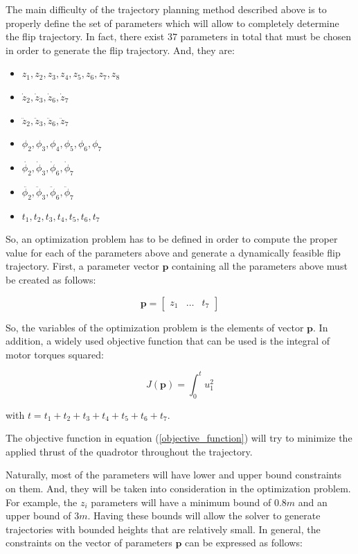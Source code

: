 \documentclass{thesisreport}
\begin{document}
The main difficulty of the trajectory planning method described above is to properly define the set of parameters which will allow to completely determine the flip trajectory. In fact, there exist $37$ parameters in total that must be chosen in order to generate the flip trajectory. And, they are:

\begin{itemize}
	\item $z_1,z_2,z_3,z_4,z_5,z_6,z_7,z_8$
	\item $\dot{z}_2, \dot{z}_3, \dot{z}_6, \dot{z}_7$
	\item $\ddot{z}_2, \ddot{z}_3, \ddot{z}_6, \ddot{z}_7$
	\item $\phi_2, \phi_3, \phi_4, \phi_5, \phi_6, \phi_7$
	\item $\dot{\phi_2}, \dot{\phi}_3, \dot{\phi}_6, \dot{\phi}_7$
	\item $\ddot{\phi_2}, \ddot{\phi}_3, \ddot{\phi}_6, \ddot{\phi}_7$
	\item $t_1, t_2, t_3, t_4, t_5, t_6, t_7$
\end{itemize}

So, an optimization problem has to be defined in order to compute the proper value for each of the parameters above and generate a dynamically feasible flip trajectory. First, a parameter vector $\bm{p}$ containing all the parameters above must be created as follows: 

\begin{equation}
	\bm{p} = \begin{bmatrix}
	z_1 & \ldots & t_7
		\end{bmatrix}
\end{equation}

So, the variables of the optimization problem is the elements of vector $\bm{p}$. In addition, a widely used objective function that can be used is the integral of motor torques squared: 

\begin{equation}\label{objective_function}
	J (\bm{p}) = \int_0^t u_1^2
\end{equation}

with $t = t_1 + t_2 + t_3 + t_4 + t_5 + t_6 + t_7$.

The objective function in equation (\ref{objective_function}) will try to minimize the applied thrust of the quadrotor throughout the trajectory.

Naturally, most of the parameters will have lower and upper bound constraints on them. And, they will be taken into consideration in the optimization problem. For example, the $z_i$ parameters will have a minimum bound of $0.8m$ and an upper bound of $3m$. Having these bounds will allow the solver to generate trajectories with bounded heights that are relatively small. In general, the constraints on the vector of parameters $\bm{p}$ can be expressed as follows: 
\end{document}
